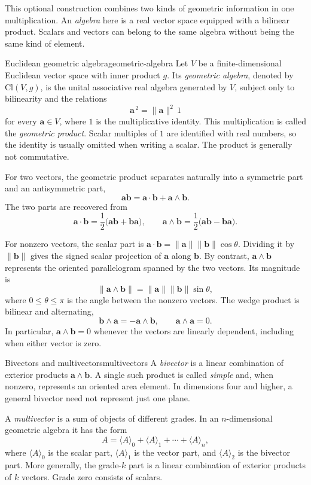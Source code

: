 \documentclass[11pt,a4paper]{article}
\newcommand{\vect}[1]{\bm{#1}}
\begin{document}
This optional construction combines two kinds of geometric information in
one multiplication. An \emph{algebra} here is a real vector space equipped
with a bilinear product. Scalars and vectors can belong to the same algebra
without being the same kind of element.

\begin{definition}{Euclidean geometric algebra}{geometric-algebra}
Let \(V\) be a finite-dimensional Euclidean vector space with inner product
\(g\). Its \emph{geometric algebra}, denoted by \(\mathrm{Cl}(V,g)\), is the
unital associative real algebra generated by \(V\), subject only to
bilinearity and
the relations
\[
  \vect{a}^{\,2}
  =\lVert\vect{a}\rVert^2\,1
\]
for every \(\vect{a}\in V\), where \(1\) is the multiplicative identity.
This multiplication is called the \emph{geometric product}. Scalar multiples
of \(1\) are identified with real numbers, so the identity is usually omitted
when writing a scalar. The product is generally not commutative.
\end{definition}

For two vectors, the geometric product separates naturally into a symmetric
part and an antisymmetric part,
\[
  \vect{a}\vect{b}
  =\vect{a}\cdot\vect{b}+\vect{a}\wedge\vect{b}.
\]
The two parts are recovered from
\[
  \vect{a}\cdot\vect{b}
  =\frac12\bigl(\vect{a}\vect{b}+\vect{b}\vect{a}\bigr),
  \qquad
  \vect{a}\wedge\vect{b}
  =\frac12\bigl(\vect{a}\vect{b}-\vect{b}\vect{a}\bigr).
\]

For nonzero vectors, the scalar part is
\(\vect a\cdot\vect b=\lVert\vect a\rVert\lVert\vect b\rVert\cos\theta\).
Dividing it by \(\lVert\vect b\rVert\) gives the signed scalar projection of
\(\vect a\) along \(\vect b\). By contrast,
\(\vect{a}\wedge\vect{b}\) represents
the oriented parallelogram spanned by the two vectors. Its magnitude is
\[
  \lVert\vect{a}\wedge\vect{b}\rVert
  =\lVert\vect{a}\rVert\lVert\vect{b}\rVert\sin\theta,
\]
where \(0\leq\theta\leq\pi\) is the angle between the nonzero vectors.
The wedge product is bilinear and alternating,
\[
  \vect b\wedge\vect a=-\vect a\wedge\vect b,
  \qquad \vect a\wedge\vect a=0.
\]
In particular, \(\vect a\wedge\vect b=0\) whenever the vectors are linearly
dependent, including when either vector is zero.

\begin{definition}{Bivectors and multivectors}{multivectors}
A \emph{bivector} is a linear combination of exterior products
\(\vect{a}\wedge\vect{b}\). A single such product is called \emph{simple}
and, when nonzero, represents an oriented area element. In dimensions four
and higher, a general bivector need not represent just one plane.

A \emph{multivector} is a sum of objects of different grades. In an
\(n\)-dimensional geometric algebra it has the form
\[
  A
  =\langle A\rangle_0+\langle A\rangle_1+\cdots+\langle A\rangle_n,
\]
where \(\langle A\rangle_0\) is the scalar part,
\(\langle A\rangle_1\) is the vector part, and
\(\langle A\rangle_2\) is the bivector part.
More generally, the grade-\(k\) part is a linear combination of exterior
products of \(k\) vectors. Grade zero consists of scalars.
\end{definition}
\end{document}
